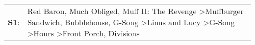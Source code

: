 \begin{supertabular}{p{0.03\textwidth}p{0.92\textwidth}}
 \textbf{S1}:  &  Red Baron\textsuperscript{}, \enspace Much Obliged\textsuperscript{}, \enspace Muff II: The Revenge\textsuperscript{} \textgreater \enspace Muffburger Sandwich\textsuperscript{}, \enspace Bubblehouse\textsuperscript{}, \enspace G-Song\textsuperscript{} \textgreater \enspace Linus and Lucy\textsuperscript{} \textgreater \enspace G-Song\textsuperscript{} \textgreater \enspace Hours\textsuperscript{} \textgreater \enspace Front Porch\textsuperscript{}, \enspace Divisions\textsuperscript{}  \enspace  \\
\end{supertabular}
